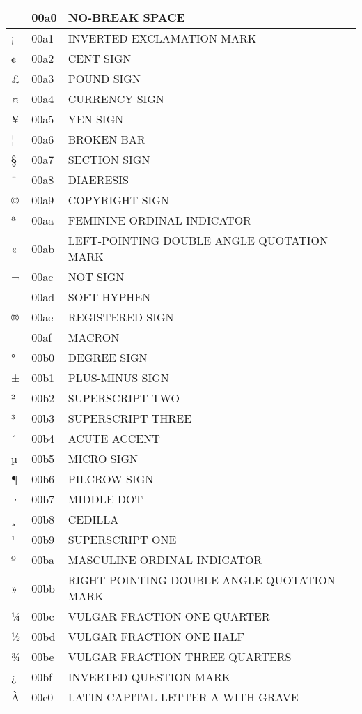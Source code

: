 \documentclass[12pt,letterpaper,openany]{book}
\begin{document}
\begin{center}
\begin{supertabular}{|m{0.25in}|m{0.5in}|m{4in}|}
			& 00a0 & NO-BREAK SPACE\\\hline
			¡ & 00a1 & INVERTED EXCLAMATION MARK\\\hline
			¢ & 00a2 & CENT SIGN\\\hline
			£ & 00a3 & POUND SIGN\\\hline
			¤ & 00a4 & CURRENCY SIGN\\\hline
			¥ & 00a5 & YEN SIGN\\\hline
			¦ & 00a6 & BROKEN BAR\\\hline
			§ & 00a7 & SECTION SIGN\\\hline
			¨ & 00a8 & DIAERESIS\\\hline
			© & 00a9 & COPYRIGHT SIGN\\\hline
			ª & 00aa & FEMININE ORDINAL INDICATOR\\\hline
			« & 00ab & LEFT-POINTING DOUBLE ANGLE QUOTATION MARK\\\hline
			¬ & 00ac & NOT SIGN\\\hline
			­ & 00ad & SOFT HYPHEN\\\hline
			® & 00ae & REGISTERED SIGN\\\hline
			¯ & 00af & MACRON\\\hline
			° & 00b0 & DEGREE SIGN\\\hline
			± & 00b1 & PLUS-MINUS SIGN\\\hline
			² & 00b2 & SUPERSCRIPT TWO\\\hline
			³ & 00b3 & SUPERSCRIPT THREE\\\hline
			´ & 00b4 & ACUTE ACCENT\\\hline
			µ & 00b5 & MICRO SIGN\\\hline
			¶ & 00b6 & PILCROW SIGN\\\hline
			· & 00b7 & MIDDLE DOT\\\hline
			¸ & 00b8 & CEDILLA\\\hline
			¹ & 00b9 & SUPERSCRIPT ONE\\\hline
			º & 00ba & MASCULINE ORDINAL INDICATOR\\\hline
			» & 00bb & RIGHT-POINTING DOUBLE ANGLE QUOTATION MARK\\\hline
			¼ & 00bc & VULGAR FRACTION ONE QUARTER\\\hline
			½ & 00bd & VULGAR FRACTION ONE HALF\\\hline
			¾ & 00be & VULGAR FRACTION THREE QUARTERS\\\hline
			¿ & 00bf & INVERTED QUESTION MARK\\\hline
			À & 00c0 & LATIN CAPITAL LETTER A WITH GRAVE\\\hline

\end{supertabular}
\end{center}
\end{document}
